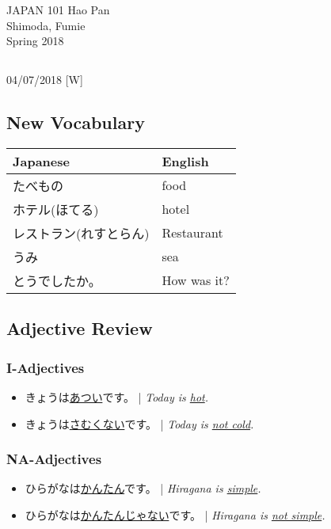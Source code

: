 \documentclass{article}
\begin{document}
 \begin{CJK}{UTF8}{min}

\noindent
{JAPAN 101 \hfill Hao Pan}\\
{Shimoda, Fumie}\\
{Spring 2018}


\begin{center}
\section{}
\noindent
{\hfill 04/07/2018 [W]}
\end{center}

\subsection{New Vocabulary}

\begin{tabular}{ | l | l | }
\hline
Japanese & English\\
\hline
たべもの & food\\
ホテル(ほてる) & hotel\\
レストラン(れすとらん) & Restaurant\\
うみ & sea\\
とうでしたか。 & How was it?\\
\hline
\end{tabular}

\subsection{Adjective Review}

\subsubsection{I-Adjectives}
\begin{itemize}
\item きょうは\uline{あつい}です。 | \emph{Today is \uline{hot}.}
\item きょうは\uline{さむくない}です。 | \emph{Today is \uline{not cold}.}
\end{itemize}

\subsubsection{NA-Adjectives}
\begin{itemize}
\item ひらがなは\uline{かんたん}です。 | \emph{Hiragana is \uline{simple}.}
\item ひらがなは\uline{かんたんじゃない}です。 | \emph{Hiragana is \uline{not simple}.}
\end{itemize}


\end{CJK}
\end{document}
